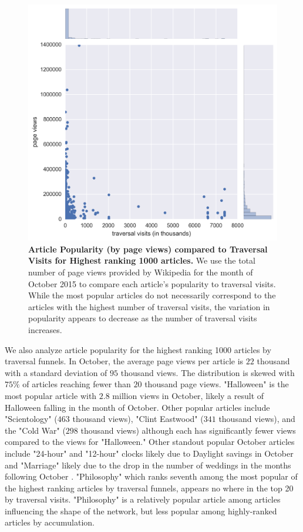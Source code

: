 \documentclass[pre,twocolumn,twoside,superscriptaddress,floatfix, aps, 10pt]{revtex4-1}
\begin{document}
\begin{figure}[tp!]
  \centering	
  \includegraphics[width=\columnwidth]{graphics/views_visits.png}
  \caption{
    \textbf{Article Popularity (by page views) compared to Traversal Visits 
    for Highest ranking 1000 articles.}
    We use the total number of page views provided by Wikipedia for the month
    of October 2015 to compare each article's popularity to traversal visits.
    While the most popular articles do not necessarily correspond to the articles
    with the highest number of traversal visits, the variation in popularity appears to decrease as the number of traversal visits increases.
  }
  \label{fig:Views and Visits}

\end{figure}



We also analyze article popularity for the highest ranking 1000 articles by 
traversal funnels. In October, the average page views per article is 
$22$ thousand with a standard deviation of $95$ thousand views. The distribution
is skewed with $75\%$ of articles reaching fewer than $20$ thousand page views. 
"Halloween" is the most popular article with $2.8$ million views in October,
likely a result of Halloween falling in the month of October. 
Other popular articles include "Scientology" ($463$ thousand views), "Clint Eastwood" 
($341$ thousand views),
and the "Cold War" ($298$ thousand views) although each has significantly fewer views compared to the views for "Halloween."
Other standout popular October articles include "24-hour" and "12-hour" clocks likely due
to Daylight savings in October and "Marriage" likely due to the drop in the number of
weddings in the months following October
\cite{weddings}.
"Philosophy" which ranks seventh among the most popular of the highest ranking articles by traversal funnels, appears no where in the top 20
by traversal visits. "Philosophy" is a relatively popular article 
among articles influencing the shape of the network, but less popular among 
highly-ranked articles by accumulation.
\end{document}
